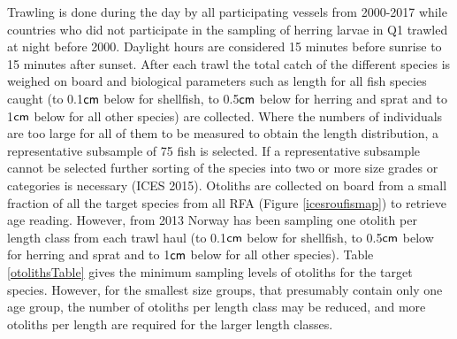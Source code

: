 \documentclass[a4paper 12pt]{article}
\numberwithin{equation}{section}
\newcommand{\cm}{\textnormal{\sffamily cm}\xspace}
\begin{document}
\indent Trawling is done during the day by all participating vessels from 2000-2017 while countries who did not participate in the sampling of herring larvae in Q1 trawled at night before 2000. Daylight hours are considered 15 minutes before sunrise to 15 minutes  after sunset. After each trawl the total catch of the different species is weighed on board and biological parameters such as length for all fish species caught (to 0.1$\cm$ below for shellfish, to 0.5$\cm$ below for herring and sprat and to 1$\cm$ below for all other species) are collected. Where the numbers of individuals are too large for all of them  to be measured to obtain the length distribution, a representative subsample of 75 fish is selected. If a representative subsample cannot be selected further sorting of the species into two or more size grades or categories is necessary (ICES 2015). Otoliths are collected on board from a small fraction of all the target species from all RFA (Figure \ref{icesroufismap}) to retrieve age reading. However, from 2013 Norway has been sampling one otolith per length class from each trawl haul (to 0.1$\cm$ below for shellfish, to 0.5$\cm$ below for herring and sprat and to 1$\cm$ below for all other species). Table \ref{otolithsTable} gives the minimum sampling levels of otoliths for the target species. However, for the smallest size groups, that presumably contain only one age group, the number of otoliths per length class may be reduced, and more otoliths per length are required for the larger length classes.\\ 
\end{document}
